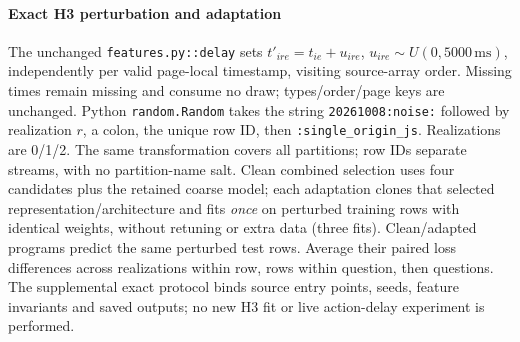 \paragraph{Exact H3 perturbation and adaptation}
The unchanged \texttt{features.py::delay} sets $t'_{ire}=t_{ie}+u_{ire}$, $u_{ire}\sim U(0,5000\,\mathrm{ms})$, independently per valid page-local timestamp, visiting source-array order. Missing times remain missing and consume no draw; types/order/page keys are unchanged. Python \texttt{random.Random} takes the string \texttt{20261008:noise:} followed by realization $r$, a colon, the unique row ID, then \texttt{:single\_origin\_js}. Realizations are 0/1/2. The same transformation covers all partitions; row IDs separate streams, with no partition-name salt. Clean combined selection uses four candidates plus the retained coarse model; each adaptation clones that selected representation/architecture and fits \emph{once} on perturbed training rows with identical weights, without retuning or extra data (three fits). Clean/adapted programs predict the same perturbed test rows. Average their paired loss differences across realizations within row, rows within question, then questions. The supplemental exact protocol binds source entry points, seeds, feature invariants and saved outputs; no new H3 fit or live action-delay experiment is performed.
